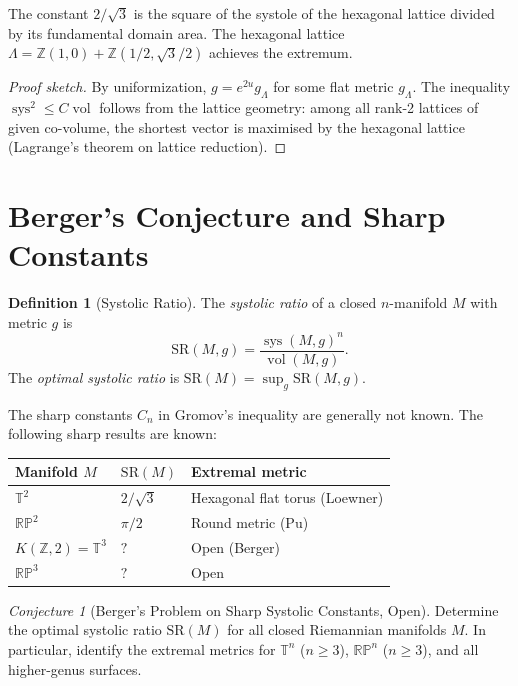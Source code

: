\documentclass[12pt,a4paper]{amsart}
\theoremstyle{definition}
\newtheorem{definition}[theorem]{Definition}
\theoremstyle{remark}
\newtheorem{conjecture}[theorem]{Conjecture}
\DeclareMathOperator{\sys}{sys}
\DeclareMathOperator{\vol}{vol}
\newcommand{\ZZ}{\mathbb{Z}}
\newcommand{\RP}{\mathbb{RP}}
\newcommand{\TT}{\mathbb{T}}
\begin{document}
The constant $2/\sqrt{3}$ is the square of the systole of the hexagonal
lattice divided by its fundamental domain area.  The hexagonal lattice
$\Lambda = \ZZ(1,0) + \ZZ(1/2, \sqrt{3}/2)$ achieves the extremum.

\begin{proof}[Proof sketch]
By uniformization, $g = e^{2u} g_\Lambda$ for some flat metric $g_\Lambda$.
The inequality $\sys^2 \le C \vol$ follows from the lattice geometry:
among all rank-2 lattices of given co-volume, the shortest vector is
maximised by the hexagonal lattice (Lagrange's theorem on lattice reduction).
\end{proof}

\section{Berger's Conjecture and Sharp Constants}

\begin{definition}[Systolic Ratio]
The \emph{systolic ratio} of a closed $n$-manifold $M$ with metric $g$ is
\[
  \mathrm{SR}(M,g) = \frac{\sys(M,g)^n}{\vol(M,g)}.
\]
The \emph{optimal systolic ratio} is $\mathrm{SR}(M) = \sup_g \mathrm{SR}(M,g)$.
\end{definition}

The sharp constants $C_n$ in Gromov's inequality are generally not known.
The following sharp results are known:

\begin{center}
\begin{tabular}{lll}
\toprule
Manifold $M$ & $\mathrm{SR}(M)$ & Extremal metric \\
\midrule
$\TT^2$ & $2/\sqrt{3}$ & Hexagonal flat torus (Loewner) \\
$\RP^2$ & $\pi/2$ & Round metric (Pu) \\
$K(\ZZ,2) = \TT^3$ & $?$ & Open (Berger) \\
$\RP^3$ & $?$ & Open \\
\bottomrule
\end{tabular}
\end{center}

\begin{conjecture}[Berger's Problem on Sharp Systolic Constants, Open]
Determine the optimal systolic ratio $\mathrm{SR}(M)$ for all closed
Riemannian manifolds $M$.  In particular, identify the extremal metrics
for $\TT^n$ ($n \ge 3$), $\RP^n$ ($n \ge 3$), and all higher-genus surfaces.
\end{conjecture}
\end{document}
